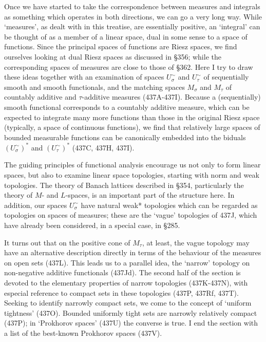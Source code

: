 
\def\frakTKR{\frak T_{\text{KR}}}
\def\MqR{M^+_{\text{qR}}}
\def\MR{M^+_{\text{R}}}
\def\PqR{P_{\text{qR}}}
\def\PR{P_{\text{R}}}
\def\sigmaKR{\sigma_{\text{KR}}}

\def\chaptername{Topologies and measures II}
\def\sectionname{Spaces of measures}


Once we have started to take the correspondence between measures and
integrals as something which operates in both directions, we can go a
very long way.   While `measures', as dealt with in this treatise, are
essentially positive, an `integral' can be thought of as a member of a
linear space, dual in some sense to a space of functions.   Since the
principal spaces of functions are Riesz spaces, we find ourselves
looking at dual Riesz spaces as discussed in \S356;  while the
corresponding spaces of measures are close to those of \S362.   Here I
try to draw these ideas together with an
examination of spaces $U^{\sim}_{\sigma}$ and $U^{\sim}_{\tau}$ of
sequentially smooth and smooth functionals, and the matching spaces
$M_{\sigma}$ and $M_{\tau}$ of countably additive and $\tau$-additive
measures (437A-437I).   Because a (sequentially) smooth functional
corresponds to a countably additive measure, which can be expected to
integrate many more functions than those in the original Riesz space
(typically, a space of continuous functions), we find that relatively
large spaces of bounded measurable functions can be canonically embedded
into the biduals $(U^{\sim}_{\sigma})^*$ and $(U^{\sim}_{\tau})^*$
(437C, 437H, 437I).

The guiding principles of functional analysis encourage us not only to
form linear spaces, but also to examine linear space topologies,
starting with norm and weak topologies.   The theory of Banach lattices
described in \S354, particularly the theory of $M$- and $L$-spaces, is
an important part of the structure here.   In addition, our spaces
$U^{\sim}_{\sigma}$ have natural weak* topologies which can be
regarded as topologies on spaces of measures;  these are the `vague'
topologies of 437J, which have already been considered, in a
special case, in \S285.

It turns out that on the positive cone of $M_{\tau}$, at least, the
vague topology may have an alternative description directly in terms of
the behaviour of the measures on
open sets (437L).   This leads us to a parallel idea, the `narrow'
topology on non-negative additive functionals (437Jd).   The second half
of the section
is devoted to the elementary properties of narrow topologies
(437K-437N), %
with especial reference to compact sets in these topologies (437P, 437Rf,
437T).
Seeking to identify narrowly compact sets, we come to the concept of
`uniform tightness' (437O).
Bounded uniformly tight sets are narrowly relatively compact (437P);  in
`Prokhorov spaces' (437U) the converse is true.  I end the section with
a list of the best-known Prokhorov spaces (437V).

